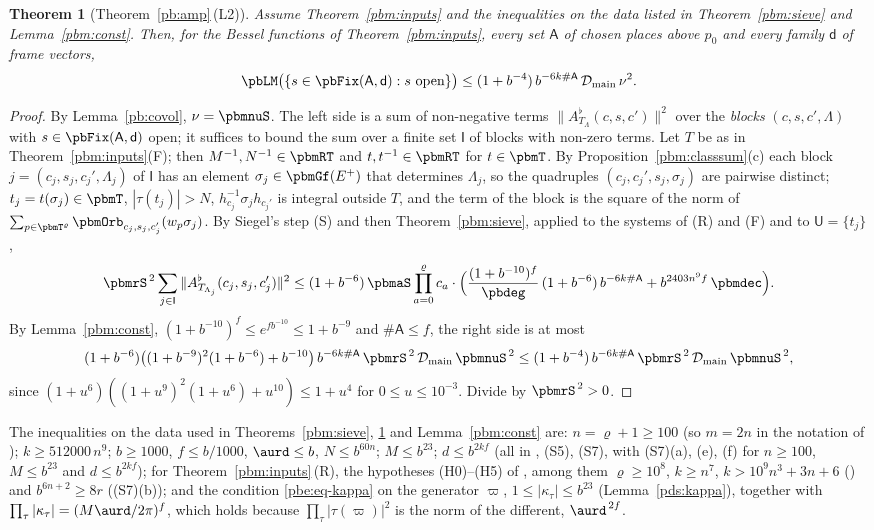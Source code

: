 \documentclass[10pt]{amsart}
\newtheorem{theorem}{Theorem}[section]
\theoremstyle{definition}
\theoremstyle{remark}
\providecommand{\pbDmain}{\mathcal D_{\mathrm{main}}}
\begin{document}
\begin{theorem}[Theorem~\ref{pb:amp}\,\textup{(L2)}]\label{pbm:L2}
Assume Theorem~\ref{pbm:inputs} and the inequalities on the data listed in Theorem~\ref{pbm:sieve}
and Lemma~\ref{pbm:const}. Then, for the Bessel functions of Theorem~\ref{pbm:inputs}, every set
$\mathsf A$ of chosen places above $p_0$ and every family $\mathsf d$ of frame vectors,
\[
\pbLM\bigl(\{s\in\pbFix(\mathsf A,\mathsf d):s\text{ open}\}\bigr)\le(1+b^{-4})\,b^{-6k\#\mathsf A}\,\pbDmain
\,\nu^2 .
\]
\end{theorem}
\begin{proof}
By Lemma~\ref{pb:covol}, $\nu=\pbmnuS$. The left side is a sum of non-negative terms $\|A^\flat_{
T_\Lambda}(c,s,c')\|^2$ over the \emph{blocks} $(c,s,c',\Lambda)$ with $s\in\pbFix(\mathsf A,\mathsf d)$
open; it suffices to bound the sum over a finite set $\mathsf I$ of blocks with non-zero terms.
Let $T$ be as in Theorem~\ref{pbm:inputs}(F); then $M^{-1},N^{-1}\in\pbmRT$ and $t,t^{-1}\in\pbmRT$
for $t\in\pbmT$. By Proposition~\ref{pbm:classsum}(c) each block $j=(c_j,s_j,c_j',\Lambda_j)$ of
$\mathsf I$ has an element $\sigma_j\in\pbmGf(E^+)$ that determines $\Lambda_j$, so the quadruples
$(c_j,c_j',s_j,\sigma_j)$ are pairwise distinct; $t_j=t(\sigma_j)\in\pbmT$, $|\tau(t_j)|>N$,
$h_{c_j}^{-1}\sigma_jh_{c_j'}$ is integral outside $T$, and the term of the block is the square of
the norm of $\sum_{p\in\pbmT^\varrho}\pbmOrb_{c_j,s_j,c_j'}(w_p\sigma_j)$. By Siegel's step (S) and then
Theorem~\ref{pbm:sieve}, applied to the systems of (R) and (F) and to $\mathsf U=\{t_j\}$,
\[
\pbmrS^{\,2}\sum_{j\in\mathsf I}\|A^\flat_{T_{\Lambda_j}}(c_j,s_j,c_j')\|^2\le(1+b^{-6})\,\pbmaS\prod_{a=0}^{
\varrho}c_a\cdot\Bigl(\frac{(1+b^{-10})^f}{\pbdeg}\,(1+b^{-6})\,b^{-6k\#\mathsf A}+b^{2403n^9f}\,\pbmdec
\Bigr).
\]
By Lemma~\ref{pbm:const}, $(1+b^{-10})^f\le e^{fb^{-10}}\le1+b^{-9}$ and $\#\mathsf A\le f$, the right
side is at most
\[
(1+b^{-6})\bigl((1+b^{-9})^2(1+b^{-6})+b^{-10}\bigr)\,b^{-6k\#\mathsf A}\,\pbmrS^{\,2}\,\pbDmain\,\pbmnuS^{\,2}
\le(1+b^{-4})\,b^{-6k\#\mathsf A}\,\pbmrS^{\,2}\,\pbDmain\,\pbmnuS^{\,2},
\]
since $(1+u^6)((1+u^9)^2(1+u^6)+u^{10})\le1+u^4$ for $0\le u\le10^{-3}$. Divide by $\pbmrS^{\,2}>0$.
\end{proof}

The inequalities on the data used in Theorems~\ref{pbm:sieve}, \ref{pbm:L2} and
Lemma~\ref{pbm:const} are: $n=\varrho+1\ge100$ (so $m=2n$ in the notation of {\cite[Lemma~13.4]{P46}}); $k\ge512000\,n^9$; $b\ge1000$, $f\le b/1000$,
$\aurd\le b$, $N\le b^{60n}$; $M\le b^{23}$; $d\le b^{2kf}$ (all in {\cite[Lemma~13.4(S1)]{P46}}, (S5),
(S7), with (S7)(a), (e), (f) for $n\ge100$, $M\le b^{23}$ and $d\le b^{2kf}$); for
Theorem~\ref{pbm:inputs}\,(R), the hypotheses (H0)--(H5) of {\cite[Theorem~2.17]{P52}}, among them
$\varrho\ge10^8$, $k\ge n^7$, $k>10^9n^3+3n+6$ ({\cite[Lemma~13.4(S7)(a)]{P46}}) and $b^{6n+2}\ge8r$
((S7)(b)); and the condition \eqref{pbe:eq-kappa} on the generator $\varpi$, $1\le|\kappa_\tau|\le b^{23}$
(Lemma~\ref{pds:kappa}), together with $\prod_\tau|\kappa_\tau|=(M\aurd/2\pi)^f$, which holds because
$\prod_\tau|\tau(\varpi)|^2$ is the norm of the different, $\aurd^{\,2f}$.
\end{document}
